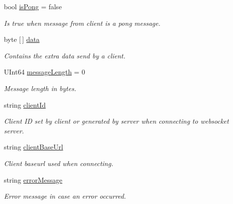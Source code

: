 \begin{DoxyCompactItemize}
bool \mbox{\hyperlink{class_simple_web_socket_server_library_1_1_web_socket_event_arg_ac6a62b7fad9a6026be6e144ff20e9557}{is\+Pong}} = false
\begin{DoxyCompactList}\small\item\em Is true when message from client is a pong message. \end{DoxyCompactList}\item 
byte \mbox{[}$\,$\mbox{]} \mbox{\hyperlink{class_simple_web_socket_server_library_1_1_web_socket_event_arg_a5e5ceea142e556d624403fcd496ed388}{data}}
\begin{DoxyCompactList}\small\item\em Contains the extra data send by a client. \end{DoxyCompactList}\item 
U\+Int64 \mbox{\hyperlink{class_simple_web_socket_server_library_1_1_web_socket_event_arg_a0b1215c622bb42a4be0dd360d60de6c6}{message\+Length}} = 0
\begin{DoxyCompactList}\small\item\em Message length in bytes. \end{DoxyCompactList}\item 
string \mbox{\hyperlink{class_simple_web_socket_server_library_1_1_web_socket_event_arg_afde3b8e9a9522972a7b5a1b0d09d8dbc}{client\+Id}}
\begin{DoxyCompactList}\small\item\em Client ID set by client or generated by server when connecting to websocket server. \end{DoxyCompactList}\item 
string \mbox{\hyperlink{class_simple_web_socket_server_library_1_1_web_socket_event_arg_a5881e5179e52593950e4418bf8045372}{client\+Base\+Url}}
\begin{DoxyCompactList}\small\item\em Client baseurl used when connecting. \end{DoxyCompactList}\item 
string \mbox{\hyperlink{class_simple_web_socket_server_library_1_1_web_socket_event_arg_af8b4dda14c45b976751e8386f99c6dda}{error\+Message}}
\begin{DoxyCompactList}\small\item\em Error message in case an error occurred. \end{DoxyCompactList}\end{DoxyCompactItemize}


